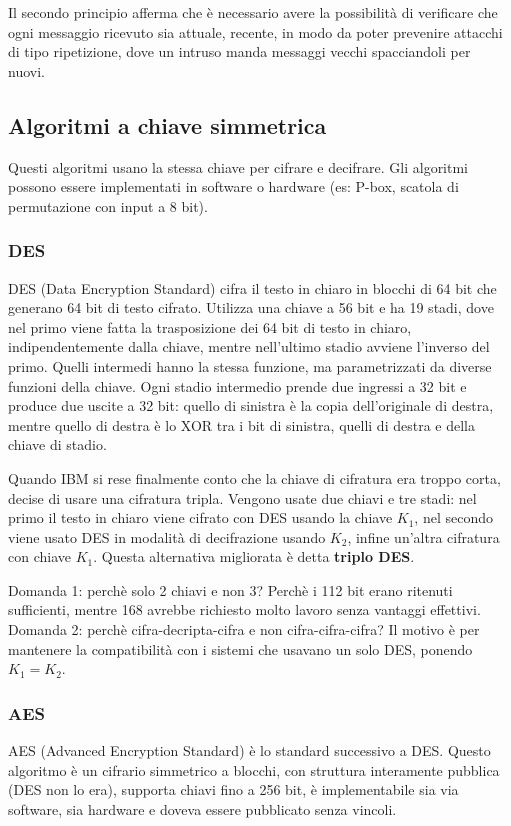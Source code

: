 Il secondo principio afferma che è necessario avere la possibilità di verificare che ogni messaggio ricevuto sia attuale, recente, in modo da poter prevenire attacchi di tipo ripetizione, 
dove un intruso manda messaggi vecchi spacciandoli per nuovi.

\subsection{Algoritmi a chiave simmetrica} %
Questi algoritmi usano la stessa chiave per cifrare e decifrare.
Gli algoritmi possono essere implementati in software o hardware (es: P-box, scatola di permutazione con input a 8 bit).

\subsubsection{DES}
DES (Data Encryption Standard) cifra il testo in chiaro in blocchi di 64 bit che generano 64 bit di testo cifrato.
Utilizza una chiave a 56 bit e ha 19 stadi, dove nel primo viene fatta la trasposizione dei 64 bit di testo in chiaro,
indipendentemente dalla chiave, mentre nell'ultimo stadio avviene l'inverso del primo. 
Quelli intermedi hanno la stessa funzione, ma parametrizzati da diverse funzioni della chiave.
Ogni stadio intermedio prende due ingressi a 32 bit e produce due uscite a 32 bit:
quello di sinistra è la copia dell'originale di destra, mentre quello di destra è lo XOR tra i bit di sinistra, quelli di destra e della chiave di stadio.

Quando IBM si rese finalmente conto che la chiave di cifratura era troppo corta, decise di usare una cifratura tripla.
Vengono usate due chiavi e tre stadi: nel primo il testo in chiaro viene cifrato con DES usando la chiave $K_1$, nel secondo viene usato DES in modalità di decifrazione usando $K_2$, infine un'altra cifratura con chiave $K_1$.
Questa alternativa migliorata è detta \textbf{triplo DES}.

Domanda 1: perchè solo 2 chiavi e non 3? Perchè i 112 bit erano ritenuti sufficienti, mentre 168 avrebbe richiesto molto lavoro senza vantaggi effettivi.\\
Domanda 2: perchè cifra-decripta-cifra e non cifra-cifra-cifra? Il motivo è per mantenere la compatibilità con i sistemi che usavano un solo DES, ponendo $K_1=K_2$.

\subsubsection{AES}
AES (Advanced Encryption Standard) è lo standard successivo a DES.
Questo algoritmo è un cifrario simmetrico a blocchi, con struttura interamente pubblica (DES non lo era), supporta chiavi fino a 256 bit, è implementabile sia via software, sia hardware e doveva essere pubblicato senza vincoli.

